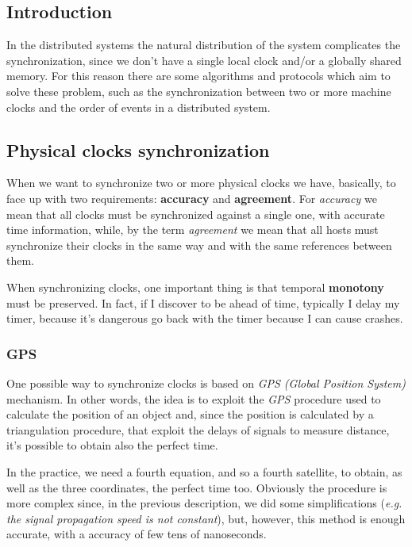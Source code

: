 \subsection{Introduction}
In the distributed systems the natural distribution of the system complicates the synchronization, since we don't have a single local clock and/or a globally shared memory. For this reason there are some algorithms and protocols which aim to solve these problem, such as the synchronization between two or more machine clocks and the order of events in a distributed system.

\subsection{Physical clocks synchronization}
When we want to synchronize two or more physical clocks we have, basically, to face up with two requirements: \textbf{accuracy} and \textbf{agreement}. For \textit{accuracy} we mean that all clocks must be synchronized against a single one, with accurate time information, while, by the term \textit{agreement} we mean that all hosts must synchronize their clocks in the same way and with the same references between them.

When synchronizing clocks, one important thing is that temporal \textbf{monotony} must be preserved. In fact, if I discover to be ahead of time, typically I delay my timer, because it's dangerous go back with the timer because I can cause crashes.

\subsubsection{GPS}
One possible way to synchronize clocks is based on \textit{GPS (Global Position System)} mechanism. In other words, the idea is to exploit the \textit{GPS} procedure used to calculate the position of an object and, since the position is calculated by a triangulation procedure, that exploit the delays of signals to measure distance, it's possible to obtain also the perfect time.

In the practice, we need a fourth equation, and so a fourth satellite, to  obtain, as well as the three coordinates, the perfect time too. Obviously the procedure is  more complex since, in the previous description, we did some simplifications (\textit{e.g. the signal propagation speed is not constant}), but, however, this method is enough accurate, with a accuracy of few tens of nanoseconds.

